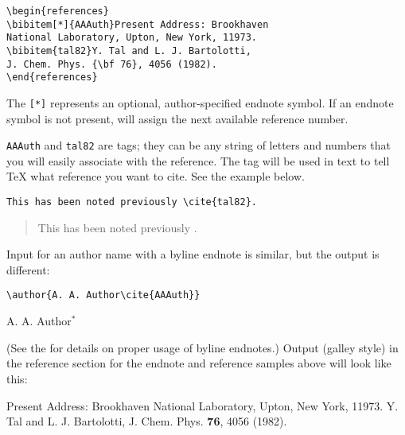 \smallskip

\begin{verbatim}
\begin{references}
\bibitem[*]{AAAuth}Present Address: Brookhaven
National Laboratory, Upton, New York, 11973.
\bibitem{tal82}Y. Tal and L. J. Bartolotti,
J. Chem. Phys. {\bf 76}, 4056 (1982).
\end{references}
\end{verbatim}

\smallskip

The \verb+[*]+ represents an optional, author-specified endnote symbol. If
an endnote symbol is not present, \REVTeX{} will assign the next available
reference number.

\verb+AAAuth+ and \verb+tal82+ are tags; they can be any string of letters
and numbers that you will easily associate with the reference.  The tag
will be used in text to tell \TeX{} what reference you want to cite. See
the example below.

\bigskip

\nocite{AAAuth}


\begin{verbatim}
This has been noted previously \cite{tal82}.
\end{verbatim}
\begin{quote}
This has been noted previously \cite{tal82}.
\end{quote}
\smallskip
Input for an author name with a byline endnote
is similar, but the output is different:

\bigskip

\begin{verbatim}
\author{A. A. Author\cite{AAAuth}}
\end{verbatim}
\bigskip
\begin{center} %
A. A. Author$^{*}$
\end{center}

\bigskip

(See the \SNG{} for details on proper usage of byline endnotes.) Output
(galley style) in the reference section for the endnote and reference
samples above will look like this:

\newpage

\begin{references}
Present Address: Brookhaven
National Laboratory, Upton, New York, 11973.
Y. Tal and L. J. Bartolotti,
J. Chem. Phys. {\bf 76}, 4056 (1982).
\end{references}

